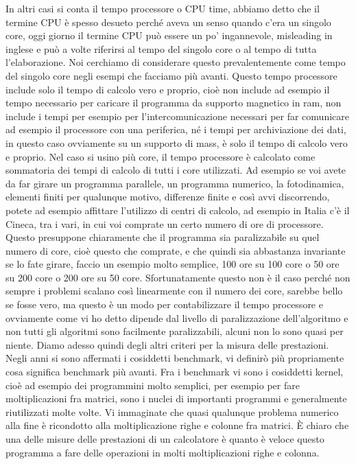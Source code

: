 In altri casi si conta il tempo processore o CPU time, abbiamo detto che il termine CPU è spesso desueto perché aveva un senso quando c'era un singolo core, oggi giorno il termine CPU può essere un po' ingannevole, misleading in inglese e può a volte riferirsi al tempo del singolo core o al tempo di tutta l'elaborazione.
Noi cerchiamo di considerare questo prevalentemente come tempo del singolo core negli esempi che facciamo più avanti.
Questo tempo processore include solo il tempo di calcolo vero e proprio, cioè non include ad esempio il tempo necessario per caricare il programma da supporto magnetico in ram, non include i tempi per esempio per l'intercomunicazione necessari per far comunicare ad esempio il processore con una periferica, né i tempi per archiviazione dei dati, in questo caso ovviamente su un supporto di mass, è solo il tempo di calcolo vero e proprio.
Nel caso si usino più core, il tempo processore è calcolato come sommatoria dei tempi di calcolo di tutti i core utilizzati.
Ad esempio se voi avete da far girare un programma parallele, un programma numerico, la fotodinamica, elementi finiti per qualunque motivo, differenze finite e così avvi discorrendo, potete ad esempio affittare l'utilizzo di centri di calcolo, ad esempio in Italia c'è il Cineca, tra i vari, in cui voi comprate un certo numero di ore di processore.
Questo presuppone chiaramente che il programma sia paralizzabile su quel numero di core, cioè questo che comprate, e che quindi sia abbastanza invariante se lo fate girare, faccio un esempio molto semplice, 100 ore su 100 core o 50 ore su 200 core o 200 ore su 50 core.
Sfortunatamente questo non è il caso perché non sempre i problemi scalano così linearmente con il numero dei core, sarebbe bello se fosse vero, ma questo è un modo per contabilizzare il tempo processore e ovviamente come vi ho detto dipende dal livello di paralizzazione dell'algoritmo e non tutti gli algoritmi sono facilmente paralizzabili, alcuni non lo sono quasi per niente.
Diamo adesso quindi degli altri criteri per la misura delle prestazioni.
Negli anni si sono affermati i cosiddetti benchmark, vi definirò più propriamente cosa significa benchmark più avanti.
Fra i benchmark vi sono i cosiddetti kernel, cioè ad esempio dei programmini molto semplici, per esempio per fare moltiplicazioni fra matrici, sono i nuclei di importanti programmi e generalmente riutilizzati molte volte.
Vi immaginate che quasi qualunque problema numerico alla fine è ricondotto alla moltiplicazione righe e colonne fra matrici.
È chiaro che una delle misure delle prestazioni di un calcolatore è quanto è veloce questo programma a fare delle operazioni in molti moltiplicazioni righe e colonna.
